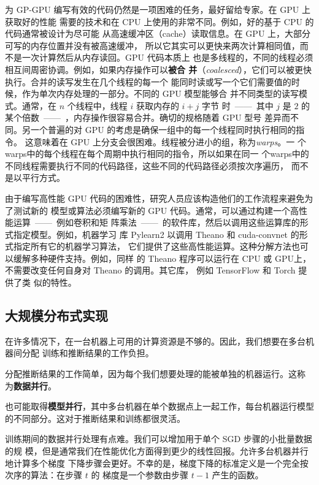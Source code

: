 为 GP-GPU 编写有效的代码仍然是一项困难的任务，最好留给专家。在 GPU 上获取好的性能
需要的技术和在 CPU 上使用的非常不同。例如，好的基于 CPU 的代码通常被设计为尽可能
从高速缓冲区（cache）读取信息。在 GPU 上，大部分可写的内存位置并没有被高速缓冲，
所以它其实可以更快来两次计算相同值，而不是一次计算然后从内存读回。GPU 代码本质上
也是多线程的，不同的线程必须相互间周密协调。例如，如果内存操作可以\textbf{被合
  并}（\textit{coalesced}），它们可以被更快执行。合并的读写发生在几个线程的每一个
能同时读或写一个它们需要值的时候，作为单次内存处理的一部分。不同的 GPU 模型能够合
并不同类型的读写模式。通常，在 $n$ 个线程中，线程 $i$ 获取内存的 $i + j$ 字节
时~——~其中 $j$ 是 $2$ 的某个倍数~——~，内存操作很容易合并。确切的规格随着 GPU 型号
差异而不同。另一个普遍的对 GPU 的考虑是确保一组中的每一个线程同时执行相同的指令。
这意味着在 GPU 上分支会很困难。线程被分进小的组，称为\emph{\gls{warps}}。一
个\gls{warps}中的每个线程在每个周期中执行相同的指令，所以如果在同一
个\gls{warps}中的不同线程需要执行不同的代码路径，这些不同的代码路径必须按次序遍历，
而不是以平行方式。

由于编写高性能 GPU 代码的困难性，研究人员应该构造他们的工作流程来避免为了测试新的
模型或算法必须编写新的 GPU 代码。通常，可以通过构建一个高性能运算~——~例如卷积和矩
阵乘法~——~的软件库，然后以调用这些运算库的形式指定模型。例如，机器学习
库 Pylearn2 \citep{journals/corr/GoodfellowWLDMPBBB13} 以调用 Theano
\citep{bergstra-proc-scipy-2010,DBLP:journals/corr/abs-1211-5590} 和
cuda-convnet \citep{krizhevsky2010convolutional} 的形式指定所有它的机器学习算法，
它们提供了这些高性能运算。这种分解方法也可以缓解多种硬件支持。例如，同样
的 Theano 程序可以运行在 CPU 或 GPU上，不需要改变任何自身对 Theano 的调用。其它库，
例如 TensorFlow \citep{tensorflow} 和 Torch \citep{collobert2011torch7} 提供了类
似的特性。

\subsection{大规模分布式实现}
\label{subsec:large_scale_distributed_implementations}

在许多情况下，在一台机器上可用的计算资源是不够的。因此，我们想要在多台机器间分配
训练和推断结果的工作负担。

分配推断结果的工作简单，因为每个我们想要处理的能被单独的机器运行。这称
为\textbf{数据并行}。

也可能取得\textbf{模型并行}，其中多台机器在单个数据点上一起工作，每台机器运行模型
的不同部分。这对于推断结果和训练都很灵活。

训练期间的数据并行处理有点难。我们可以增加用于单个 \gls{SGD} 步骤的小批量数据的规
模，但是通常我们在性能优化方面得到更少的线性回报。允许多台机器并行地计算多个梯度
下降步骤会更好。不幸的是，梯度下降的标准定义是一个完全按次序的算法：在步骤 $t$ 的
梯度是一个参数由步骤 $t-1$ 产生的函数。

